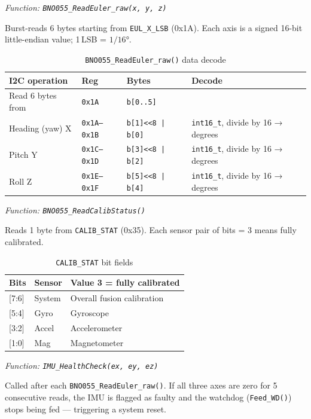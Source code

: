 \documentclass[12pt,a4paper]{article}
\begin{document}
\textit{Function: \texttt{BNO055\_ReadEuler\_raw(x, y, z)}}

Burst-reads 6 bytes starting from \texttt{EUL\_X\_LSB} (0x1A).
Each axis is a signed 16-bit little-endian value; 1\,LSB = \(1/16\)°.

\begin{table}[H]
\centering
\begin{tabular}{llll}
\hline
\textbf{I2C operation} & \textbf{Reg} & \textbf{Bytes} & \textbf{Decode} \\
\hline
Read 6 bytes from & \texttt{0x1A} & \texttt{b[0..5]} & \\
Heading (yaw) X   & \texttt{0x1A--0x1B} & \texttt{b[1]<<8 | b[0]} & \texttt{int16\_t}, divide by 16 → degrees \\
Pitch Y           & \texttt{0x1C--0x1D} & \texttt{b[3]<<8 | b[2]} & \texttt{int16\_t}, divide by 16 → degrees \\
Roll Z            & \texttt{0x1E--0x1F} & \texttt{b[5]<<8 | b[4]} & \texttt{int16\_t}, divide by 16 → degrees \\
\hline
\end{tabular}
\caption{\texttt{BNO055\_ReadEuler\_raw()} data decode}
\end{table}

\textit{Function: \texttt{BNO055\_ReadCalibStatus()}}

Reads 1 byte from \texttt{CALIB\_STAT} (0x35). Each sensor pair of bits = 3 means fully calibrated.

\begin{table}[H]
\centering
\begin{tabular}{lll}
\hline
\textbf{Bits} & \textbf{Sensor} & \textbf{Value 3 = fully calibrated} \\
\hline
{[7:6]} & System  & Overall fusion calibration \\
{[5:4]} & Gyro    & Gyroscope \\
{[3:2]} & Accel   & Accelerometer \\
{[1:0]} & Mag     & Magnetometer \\
\hline
\end{tabular}
\caption{\texttt{CALIB\_STAT} bit fields}
\end{table}

\textit{Function: \texttt{IMU\_HealthCheck(ex, ey, ez)}}

Called after each \texttt{BNO055\_ReadEuler\_raw()}. If all three axes are zero for 5 consecutive reads,
the IMU is flagged as faulty and the watchdog (\texttt{Feed\_WD()}) stops being fed — triggering a system reset.
\end{document}
